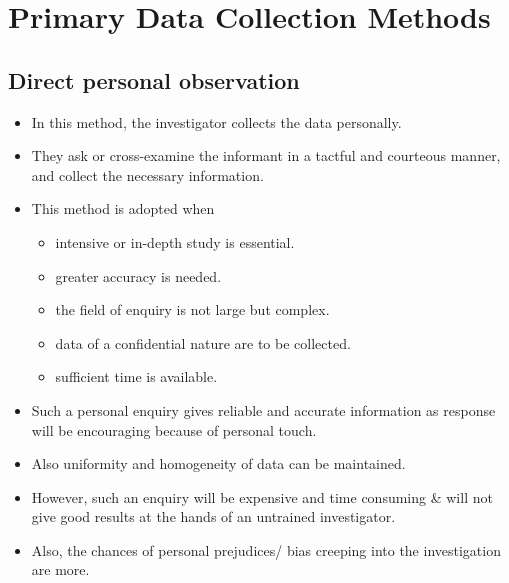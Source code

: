 \documentclass[
10pt, %
a4paper, %
]{report}
\begin{document}
\section{Primary Data Collection Methods}

\subsection{Direct personal observation}
\begin{itemize}
\item In this method, the investigator collects the data personally.
\item They ask or cross-examine the informant in a tactful and courteous manner, and collect the necessary information.
\item This method is adopted when
\begin{itemize}
\item intensive or in-depth study is essential.
\item greater accuracy is needed.
\item the field of enquiry is not large but complex.
\item data of a confidential nature are to be collected.
\item sufficient time is available.
\end{itemize}
\item Such a personal enquiry gives reliable and accurate information as
response will be encouraging because of personal touch.
\item Also uniformity and homogeneity of data can be maintained.
\item However, such an enquiry will be expensive and time consuming \& will not give good results at the hands of an untrained investigator.
\item Also, the chances of personal prejudices/ bias creeping into the investigation are more.
\end{itemize}
\end{document}
